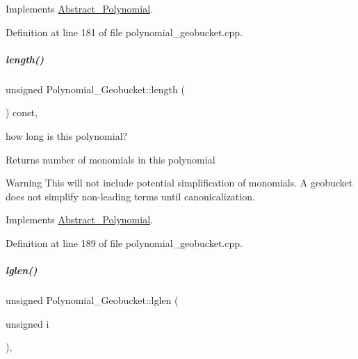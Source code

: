 Implements \hyperlink{group__polygroup_a9186ed0f55c5cc4ecb1b9bc11ba9f679}{Abstract\+\_\+\+Polynomial}.



Definition at line 181 of file polynomial\+\_\+geobucket.\+cpp.

\mbox{\label{group__polygroup_a691f704d695210841a60fe2e6791d1af}} 
\subparagraph{\texorpdfstring{length()}{length()}}
{\footnotesize\ttfamily unsigned Polynomial\+\_\+\+Geobucket\+::length (\begin{DoxyParamCaption}{ }\end{DoxyParamCaption}) const\hspace{0.3cm}{\ttfamily [override]}, {\ttfamily [virtual]}}



how long is this polynomial? 

\begin{DoxyReturn}{Returns}
number of monomials in this polynomial 
\end{DoxyReturn}
\begin{DoxyWarning}{Warning}
This will not include potential simplification of monomials. A geobucket does not simplify non-\/leading terms until canonicalization. 
\end{DoxyWarning}


Implements \hyperlink{group__polygroup_a48f4c3c030ca66a9386cd71f71d5def7}{Abstract\+\_\+\+Polynomial}.



Definition at line 189 of file polynomial\+\_\+geobucket.\+cpp.

\mbox{\label{group__polygroup_a82e8a9286f5c30e48c13e05d74af7fb9}} 
\subparagraph{\texorpdfstring{lglen()}{lglen()}}
{\footnotesize\ttfamily unsigned Polynomial\+\_\+\+Geobucket\+::lglen (\begin{DoxyParamCaption}\item[{unsigned}]{i }\end{DoxyParamCaption})\hspace{0.3cm}{\ttfamily [inline]}, {\ttfamily [protected]}}



